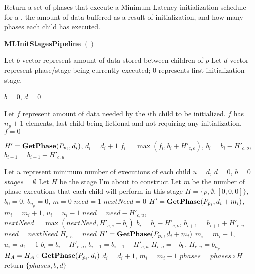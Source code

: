\begin{algorithm}
\label{alg:min-lat-init-pipeline} \caption{Return a set of phases
that execute a Minimum-Latency initialization schedule for a
{\pipeline}, the amount of data buffered as a result of
initialization, and how many phases each child has executed.} {\bf
MLInitStagesPipeline} $()$
\begin{algorithmic}
\STATE Let $b$ vector represent amount of data stored between children of
$p$
\STATE Let $d$ vector represent phase/stage being currently executed; 0
represents first initialization stage.


\STATE $b = 0$, $d = 0$

\STATE Let $f$ represent amount of data needed by the $i$th child
to be initialized.  $f$ has $n_p+1$ elements, last child being
fictional and not requiring any initialization.
\STATE $f = 0$

\STATE $H' = {\bf GetPhase}(P_{p_i}, d_i)$, $d_i = d_i + 1$
\STATE $f_i = \max(f_i, b_i + H'_{c, e})$, $b_i = b_i - H'_{c,
o}$, $b_{i+1} = b_{i+1} + H'_{c, u}$
\ENDWHILE
\ENDFOR

\STATE Let $u$ represent minimum number of executions of each
child
\STATE $u = d$, $d = 0$, $b = 0$
\STATE $stages = \emptyset$
\STATE Let $H$ be the stage I'm about to construct
\STATE Let $m$ be the number of phase executions that each child
will perform in this stage
\STATE $H = \{p, \emptyset, [0,0,0]\}$, $b_0 = 0$, $b_{n_p} = 0$, $m = 0$
\STATE $need = 1$
\STATE $nextNeed = 0$
\STATE $H' = {\bf GetPhase}(P_{p_i}, d_i + m_i)$, $m_i = m_i + 1$, $u_i = u_i - 1$
\STATE $need = need - H'_{c, u}$, $nextNeed = \max(nextNeed, H'_{c, e} - b_i)$
\STATE $b_i = b_i - H'_{c, o}$, $b_{i+1} = b_{i+1} + H'_{c, u}$
\ENDWHILE
\STATE $need = nextNeed$
\ENDFOR
\STATE $H_{c,e} = need$
\STATE $H' = {\bf GetPhase}(P_{p_i}, d_i + m_i)$
\STATE $m_i = m_i + 1$, $u_i = u_1 - 1$
\STATE $b_i = b_i - H'_{c, o}$, $b_{i+1} = b_{i+1} + H'_{c, u}$
\ELSE
{}
\ENDIF
\ENDWHILE
\ENDFOR
\STATE $H_{c,o} = -b_0$, $H_{c,u} = b_{n_p}$
\STATE $H_A = H_A \circ {\bf GetPhase}(P_{p_i}, d_i)$
\STATE $d_i = d_i + 1$, $m_i = m_i - 1$
\ENDWHILE
\ENDFOR
\STATE $phases = phases \circ H$
\ENDWHILE
\STATE return $\{phases, b, d\}$
\end{algorithmic}
\end{algorithm}

